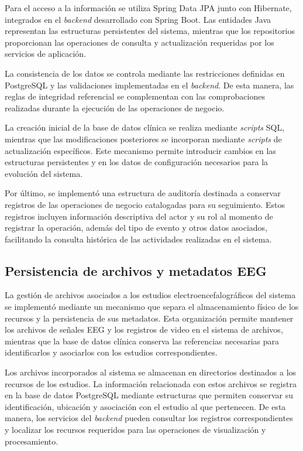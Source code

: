 Para el acceso a la información se utiliza Spring Data
JPA junto con Hibernate, integrados en el \textit{backend}
desarrollado con Spring Boot. Las entidades Java
representan las estructuras persistentes del sistema,
mientras que los repositorios proporcionan las
operaciones de consulta y actualización requeridas
por los servicios de aplicación.

La consistencia de los datos se controla mediante
las restricciones definidas en PostgreSQL y las
validaciones implementadas en el \textit{backend}. De esta
manera, las reglas de integridad referencial se
complementan con las comprobaciones realizadas
durante la ejecución de las operaciones de negocio.

La creación inicial de la base de datos clínica se
realiza mediante \textit{scripts} SQL, mientras que las
modificaciones posteriores se incorporan mediante
\textit{scripts} de actualización específicos. Este mecanismo
permite introducir cambios en las estructuras
persistentes y en los datos de configuración
necesarios para la evolución del sistema.

Por último, se implementó una estructura de auditoría
destinada a conservar registros de las operaciones
de negocio catalogadas para su seguimiento. Estos
registros incluyen información descriptiva del
actor y su rol al momento de registrar la operación,
además del tipo de evento y otros datos asociados,
facilitando la consulta histórica de las actividades
realizadas en el sistema.


\subsection{Persistencia de archivos y metadatos EEG}

La gestión de archivos asociados a los estudios
electroencefalográficos del sistema se implementó
mediante un mecanismo que separa el almacenamiento
físico de los recursos y la persistencia de sus
metadatos. Esta organización permite mantener los
archivos de señales EEG y los registros de video
en el sistema de archivos, mientras que la base
de datos clínica conserva las referencias
necesarias para identificarlos y asociarlos con
los estudios correspondientes.

Los archivos incorporados al sistema se almacenan
en directorios destinados a los recursos de los
estudios. La información relacionada con estos
archivos se registra en la base de datos PostgreSQL
mediante estructuras que permiten conservar su
identificación, ubicación y asociación con el
estudio al que pertenecen. De esta manera, los
servicios del \textit{backend} pueden consultar los
registros correspondientes y localizar los
recursos requeridos para las operaciones de
visualización y procesamiento.

